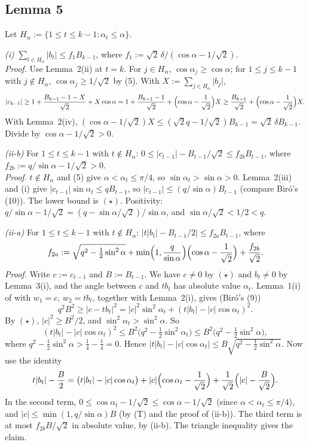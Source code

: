 \documentclass[11pt]{amsart}
\theoremstyle{remark}
\theoremstyle{plain}
\newcommand{\abs}[1]{\lvert #1\rvert}
\begin{document}
\subsection{Lemma 5}\label{app:lemma5}
Let $H_\alpha:=\{1\le t\le k-1:\alpha_t\le\alpha\}$.

\emph{(i)} $\sum_{t\in H_\alpha}\abs{b_t}\le f_1B_{k-1}$, where $f_1:=\sqrt2\,\delta/(\cos\alpha-1/\sqrt2)$. \\
\emph{Proof.} Use Lemma~2(ii) at $t=k$. For $j\in H_\alpha$, $\cos\alpha_j\ge\cos\alpha$; for $1\le j\le k-1$ with $j\notin H_\alpha$, $\cos\alpha_j\ge1/\sqrt2$ by (5). With $X:=\sum_{j\in H_\alpha}\abs{b_j}$,
\[
\abs{c_{k-1}}\ge1+\frac{B_{k-1}-1-X}{\sqrt2}+X\cos\alpha=1+\frac{B_{k-1}-1}{\sqrt2}+\Bigl(\cos\alpha-\frac1{\sqrt2}\Bigr)X\ge\frac{B_{k-1}}{\sqrt2}+\Bigl(\cos\alpha-\frac1{\sqrt2}\Bigr)X.
\]
With Lemma~2(iv), $(\cos\alpha-1/\sqrt2)X\le(\sqrt2q-1/\sqrt2)B_{k-1}=\sqrt2\,\delta B_{k-1}$. Divide by $\cos\alpha-1/\sqrt2>0$.

\emph{(ii-b)} For $1\le t\le k-1$ with $t\notin H_\alpha$: $0\le\abs{c_{t-1}}-B_{t-1}/\sqrt2\le f_{2b}B_{t-1}$, where $f_{2b}:=q/\sin\alpha-1/\sqrt2>0$. \\
\emph{Proof.} $t\notin H_\alpha$ and (5) give $\alpha<\alpha_t\le\pi/4$, so $\sin\alpha_t>\sin\alpha>0$. Lemma~2(iii) and (i) give $\abs{c_{t-1}}\sin\alpha_t\le qB_{t-1}$, so $\abs{c_{t-1}}\le(q/\sin\alpha)B_{t-1}$ (compare Bir\'o's (10)). The lower bound is $(\star)$. Positivity: $q/\sin\alpha-1/\sqrt2=(q-\sin\alpha/\sqrt2)/\sin\alpha$, and $\sin\alpha/\sqrt2<1/2<q$.

\emph{(ii-a)} For $1\le t\le k-1$ with $t\notin H_\alpha$: $\bigl|t\abs{b_t}-B_{t-1}/2\bigr|\le f_{2a}B_{t-1}$, where
\[
f_{2a}:=\sqrt{q^2-\tfrac12\sin^2\alpha}+\min\Bigl(1,\frac q{\sin\alpha}\Bigr)\Bigl(\cos\alpha-\frac1{\sqrt2}\Bigr)+\frac{f_{2b}}{\sqrt2}.
\]
\emph{Proof.} Write $c:=c_{t-1}$ and $B:=B_{t-1}$. We have $c\ne0$ by $(\star)$ and $b_t\ne0$ by Lemma~3(i), and the angle between $c$ and $tb_t$ has absolute value $\alpha_t$. Lemma~1(i) of \cite{Bir00b} with $w_1=c$, $w_2=tb_t$, together with Lemma~2(i), gives (Bir\'o's (9))
\[
q^2B^2\ge\abs{c-tb_t}^2=\abs c^2\sin^2\alpha_t+(t\abs{b_t}-\abs c\cos\alpha_t)^2.
\]
By $(\star)$, $\abs c^2\ge B^2/2$, and $\sin^2\alpha_t>\sin^2\alpha$. So
\[
(t\abs{b_t}-\abs c\cos\alpha_t)^2\le B^2\bigl(q^2-\tfrac12\sin^2\alpha_t\bigr)\le B^2\bigl(q^2-\tfrac12\sin^2\alpha\bigr),
\]
where $q^2-\frac12\sin^2\alpha>\frac14-\frac14=0$. Hence $\bigl|t\abs{b_t}-\abs c\cos\alpha_t\bigr|\le B\sqrt{q^2-\frac12\sin^2\alpha}$. Now use the identity
\[
t\abs{b_t}-\frac B2=\bigl(t\abs{b_t}-\abs c\cos\alpha_t\bigr)+\abs c\Bigl(\cos\alpha_t-\frac1{\sqrt2}\Bigr)+\frac1{\sqrt2}\Bigl(\abs c-\frac B{\sqrt2}\Bigr).
\]
In the second term, $0\le\cos\alpha_t-1/\sqrt2\le\cos\alpha-1/\sqrt2$ (since $\alpha<\alpha_t\le\pi/4$), and $\abs c\le\min(1,q/\sin\alpha)B$ (by (T) and the proof of (ii-b)). The third term is at most $f_{2b}B/\sqrt2$ in absolute value, by (ii-b). The triangle inequality gives the claim.
\end{document}
